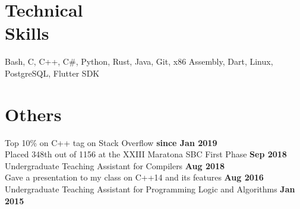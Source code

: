 \documentclass[margin,line]{resume}
\begin{document}
\begin{resume}
    \section{\mysidestyle Technical\\Skills}

    Bash, C, C++, C\#, Python, Rust, Java, Git, x86 Assembly, Dart, Linux, PostgreSQL, Flutter SDK

    \section{\mysidestyle Others}

    Top 10\% on C++ tag on Stack Overflow \hfill \textbf{since Jan 2019}\\
    Placed 348th out of 1156 at the XXIII Maratona SBC First Phase \hfill \textbf{Sep 2018}\\
    Undergraduate Teaching Assistant for Compilers \hfill \textbf{Aug 2018}\\
    Gave a presentation to my class on C++14 and its features \hfill \textbf{Aug 2016}\\
    Undergraduate Teaching Assistant for Programming Logic and Algorithms \hfill \textbf{Jan 2015}\\

\end{resume}
\end{document}
